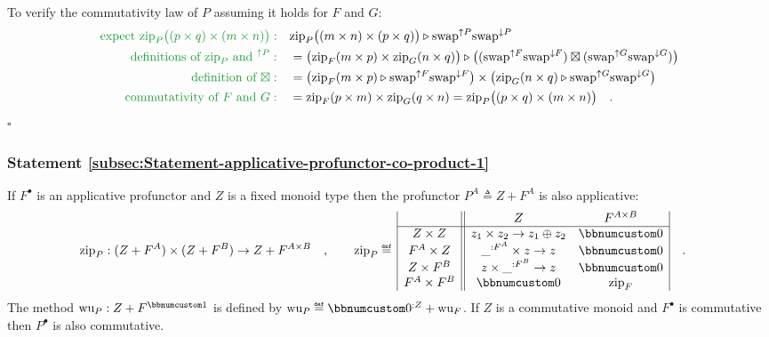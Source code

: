 To verify the commutativity law of $P$ assuming it holds for $F$
and $G$:
\begin{align*}
{\color{greenunder}\text{expect }\text{zip}_{P}\big((p\times q)\times(m\times n)\big):}\quad & \text{zip}_{P}\big((m\times n)\times(p\times q)\big)\triangleright\text{swap}^{\uparrow P}\text{swap}^{\downarrow P}\\
{\color{greenunder}\text{definitions of }\text{zip}_{P}\text{ and }^{\uparrow P}:}\quad & =\big(\text{zip}_{F}(m\times p)\times\text{zip}_{G}(n\times q)\big)\triangleright\big((\text{swap}^{\uparrow F}\text{swap}^{\downarrow F})\boxtimes(\text{swap}^{\uparrow G}\text{swap}^{\downarrow G})\big)\\
{\color{greenunder}\text{definition of }\boxtimes:}\quad & =\big(\text{zip}_{F}(m\times p)\triangleright\text{swap}^{\uparrow F}\text{swap}^{\downarrow F}\big)\times\big(\text{zip}_{G}(n\times q)\triangleright\text{swap}^{\uparrow G}\text{swap}^{\downarrow G}\big)\\
{\color{greenunder}\text{commutativity of }F\text{ and }G:}\quad & =\text{zip}_{F}(p\times m)\times\text{zip}_{G}(q\times n)=\text{zip}_{P}\big((p\times q)\times(m\times n)\big)\quad.
\end{align*}
$\square$

\subsubsection{Statement \label{subsec:Statement-applicative-profunctor-co-product-1}\ref{subsec:Statement-applicative-profunctor-co-product-1}}

If $F^{\bullet}$ is an applicative profunctor and $Z$ is a fixed
monoid type then the profunctor $P^{A}\triangleq Z+F^{A}$ is also
applicative:
\begin{align*}
 & \text{zip}_{P}:(Z+F^{A})\times(Z+F^{B})\rightarrow Z+F^{A\times B}\quad,\quad\quad\text{zip}_{P}\triangleq\,\begin{array}{|c||cc|}
 & Z & F^{A\times B}\\
\hline Z\times Z & z_{1}\times z_{2}\rightarrow z_{1}\oplus z_{2} & \bbnum 0\\
F^{A}\times Z & \_^{:F^{A}}\times z\rightarrow z & \bbnum 0\\
Z\times F^{B} & z\times\_^{:F^{B}}\rightarrow z & \bbnum 0\\
F^{A}\times F^{B} & \bbnum 0 & \text{zip}_{F}
\end{array}\quad.
\end{align*}
The method $\text{wu}_{P}:Z+F^{\bbnum 1}$ is defined by $\text{wu}_{P}\triangleq\bbnum 0^{:Z}+\text{wu}_{F}$.
If $Z$ is a commutative monoid and $F^{\bullet}$ is commutative
then $P^{\bullet}$ is also commutative.

